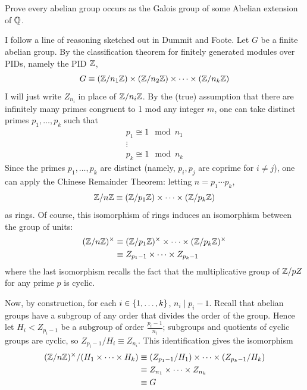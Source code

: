 \documentclass[12pt]{article}
\begin{document}
\section{} 
Prove every abelian group occurs as the Galois group of some Abelian extension of $\mathbb{Q}$. 

\noindent \dotfill 

I follow a line of reasoning sketched out in Dummit and Foote. 
Let $G$ be a finite abelian group. 
By the classification theorem for finitely generated modules over PIDs, namely the PID $\mathbb{Z}$, 
$$G \equiv (\Z / n_1 \Z) \times (\Z / n_2 \Z) \times \cdots \times (\Z / n_k \Z)$$
I will just write $Z_{n_i}$ in place of $\mathbb{Z} / n_i \mathbb{Z}$. 
By the (true) assumption that there are infinitely many primes congruent to 1 mod any integer $m$, one can take distinct primes $p_1, \ldots, p_k$ such that 
\begin{gather*}
  p_1 \cong 1 \mod n_1 \\ 
  \vdots  \\ 
  p_k \cong 1 \mod n_k
\end{gather*}
Since the primes $p_1, \ldots, p_k$ are distinct (namely, $p_i, p_j$ are coprime for $i \neq j$), one can apply the Chinese Remainder Theorem: 
letting $n = p_1 \cdots p_k$, 
$$\Z / n\Z \equiv (\Z / p_1 \Z) \times \cdots \times (\Z / p_k \Z)$$
as rings. 
Of course, this isomorphism of rings induces an isomorphism between the group of units: 
\begin{align*}
  (\Z / n\Z)^\times & \equiv (\Z / p_1 \Z)^{\times} \times \cdots \times (\Z / p_k \Z)^{\times} \\ 
					& \equiv Z_{p_1 - 1} \times \cdots \times Z_{p_k - 1}
\end{align*}
where the last isomorphism recalls the fact that the multiplicative group of $\mathbb{Z} / pZ$ for any prime $p$ is cyclic. 

Now, by construction, for each $i \in \{1, \ldots, k\}$, $n_i \mid p_i - 1$. 
Recall that abelian groups have a subgroup of any order that divides the order of the group. 
Hence let $H_i < Z_{p_i - 1}$ be a subgroup of order $\frac{p_i - 1}{n_i}$; 
subgroups and quotients of cyclic groups are cyclic, so $Z_{p_i - 1} / H_i \equiv Z_{n_i}$. 
This identification gives the isomorphism 
\begin{align*}
  (\Z / n\Z)^\times / (H_1 \times \cdots \times H_k) 
  & \equiv (Z_{p_1 - 1} / H_1) \times \cdots \times (Z_{p_k - 1} / H_k) \\ 
  & \equiv Z_{n_1} \times \cdots \times Z_{n_k}  \\ 
  & \equiv G
\end{align*}
\end{document}
